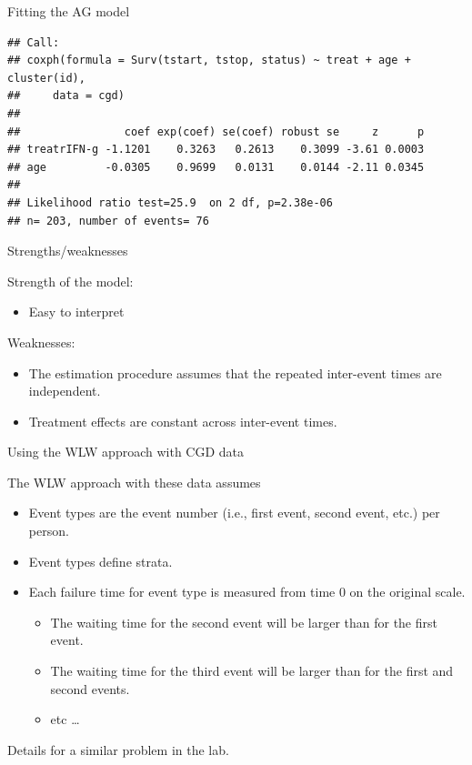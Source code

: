 \documentclass[ignorenonframetext,]{beamer}
\providecommand{\tightlist}{%
  \setlength{\itemsep}{0pt}\setlength{\parskip}{0pt}}
\begin{document}
\begin{frame}[fragile]{%
\protect\hypertarget{fitting-the-ag-model-1}{%
Fitting the AG model}}

\footnotesize

\begin{verbatim}
## Call:
## coxph(formula = Surv(tstart, tstop, status) ~ treat + age + cluster(id), 
##     data = cgd)
## 
##                coef exp(coef) se(coef) robust se     z      p
## treatrIFN-g -1.1201    0.3263   0.2613    0.3099 -3.61 0.0003
## age         -0.0305    0.9699   0.0131    0.0144 -2.11 0.0345
## 
## Likelihood ratio test=25.9  on 2 df, p=2.38e-06
## n= 203, number of events= 76
\end{verbatim}

\end{frame}

\begin{frame}{%
\protect\hypertarget{strengthsweaknesses}{%
Strengths/weaknesses}}

Strength of the model:

\begin{itemize}
\tightlist
\item
  Easy to interpret
\end{itemize}

Weaknesses:

\begin{itemize}
\item
  The estimation procedure assumes that the repeated inter-event times
  are independent.
\item
  Treatment effects are constant across inter-event times.
\end{itemize}

\end{frame}

\begin{frame}{%
\protect\hypertarget{using-the-wlw-approach-with-cgd-data}{%
Using the WLW approach with CGD data}}

The WLW approach with these data assumes

\begin{itemize}
\item
  Event types are the event number (i.e., first event, second event,
  etc.) per person.
\item
  Event types define strata.
\item
  Each failure time for event type is measured from time 0 on the
  original scale.

  \begin{itemize}
  \item
    The waiting time for the second event will be larger than for the
    first event.
  \item
    The waiting time for the third event will be larger than for the
    first and second events.
  \item
    etc \ldots
  \end{itemize}
\end{itemize}

Details for a similar problem in the lab.

\end{frame}
\end{document}
